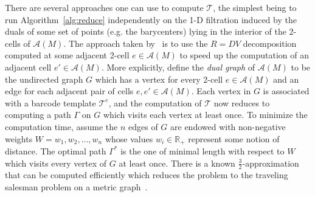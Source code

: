 \documentclass[sn-mathphys]{sn-jnl}
\begin{document}
There are several approaches one can use to compute $\mathcal{T}$, the simplest being to run Algorithm~\ref{alg:reduce} independently on the 1-D filtration induced by the duals of some set of points (e.g. the barycenters) lying in the interior of the 2-cells of $\mathcal{A}(M)$.  
The approach taken by~\cite{lesnick2015interactive} is to use the $R = DV$ decomposition computed at some adjacent 2-cell $e \in \mathcal{A}(M)$ to speed up the computation of an adjacent cell $e' \in \mathcal{A}(M)$. More explicitly, define the \emph{dual graph} of $\mathcal{A}(M)$ to be the undirected graph $G$ which has a vertex for every 2-cell $e \in \mathcal{A}(M)$ and an edge for each adjacent pair of cells $e, e' \in \mathcal{A}(M)$.
Each vertex in $G$ is associated with a barcode template $\mathcal{T}^e$, and the computation of $\mathcal{T}$ now reduces to computing a path $\Gamma$ on $G$ which visits each vertex at least once. To minimize the computation time, assume the $n$ edges of $G$ are endowed with non-negative weights $W = w_1, w_2, \dots, w_n$ whose values $w_i \in \mathbb{R}_{+}$ represent some notion of distance. The optimal path $\Gamma^\ast$ is the one of minimal length with respect to $W$ which visits every vertex of $G$ at least once. There is a known $\frac{3}{2}$-approximation that can be computed efficiently which reduces the problem to the traveling salesman problem on a metric graph~\cite{christofides2022worst}.

\end{document}
